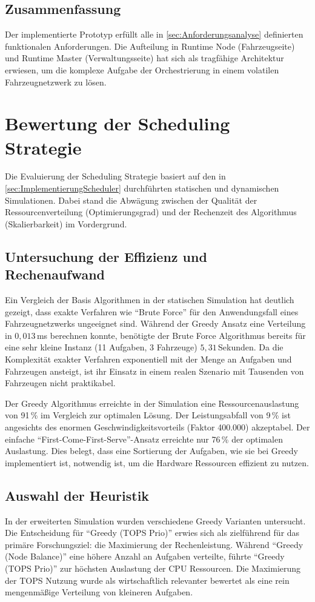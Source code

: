 \subsection{Zusammenfassung}
Der implementierte Prototyp erfüllt alle in \autoref{sec:Anforderungsanalyse} definierten funktionalen Anforderungen. Die Aufteilung in Runtime Node (Fahrzeugseite) und Runtime Master (Verwaltungsseite) hat sich als tragfähige Architektur erwiesen, um die komplexe Aufgabe der Orchestrierung in einem volatilen Fahrzeugnetzwerk zu lösen.

\section{Bewertung der Scheduling Strategie}
\label{sec:BewertungScheduling}

Die Evaluierung der Scheduling Strategie basiert auf den in \autoref{sec:ImplementierungScheduler} durchführten statischen und dynamischen Simulationen. Dabei stand die Abwägung zwischen der Qualität der Ressourcenverteilung (Optimierungsgrad) und der Rechenzeit des Algorithmus (Skalierbarkeit) im Vordergrund.

\subsection{Untersuchung der Effizienz und Rechenaufwand}
Ein Vergleich der Basis Algorithmen in der statischen Simulation hat deutlich gezeigt, dass exakte Verfahren wie \enquote{Brute Force} für den Anwendungsfall eines Fahrzeugnetzwerks ungeeignet sind. Während der Greedy Ansatz eine Verteilung in $0,013$\,ms berechnen konnte, benötigte der Brute Force Algorithmus bereits für eine sehr kleine Instanz (11 Aufgaben, 3 Fahrzeuge) $5,31$\,Sekunden. Da die Komplexität exakter Verfahren exponentiell mit der Menge an Aufgaben und Fahrzeugen ansteigt, ist ihr Einsatz in einem realen Szenario mit Tausenden von Fahrzeugen nicht praktikabel. 

Der Greedy Algorithmus erreichte in der Simulation eine Ressourcenauslastung von 91\,\% im Vergleich zur optimalen Lösung. Der Leistungsabfall von 9\,\% ist angesichts des enormen Geschwindigkeitsvorteils (Faktor 400.000) akzeptabel. Der einfache \enquote{First-Come-First-Serve}-Ansatz erreichte nur 76\,\% der optimalen Auslastung. Dies belegt, dass eine Sortierung der Aufgaben, wie sie bei Greedy implementiert ist, notwendig ist, um die Hardware Ressourcen effizient zu nutzen.

\subsection{Auswahl der Heuristik}
In der erweiterten Simulation wurden verschiedene Greedy Varianten untersucht. Die Entscheidung für \enquote{Greedy (TOPS Prio)} erwies sich als zielführend für das primäre Forschungsziel: die Maximierung der Rechenleistung. Während \enquote{Greedy (Node Balance)} eine höhere Anzahl an Aufgaben verteilte, führte \enquote{Greedy (TOPS Prio)} zur höchsten Auslastung der CPU Ressourcen. Die Maximierung der TOPS Nutzung wurde als wirtschaftlich relevanter bewertet als eine rein mengenmäßige Verteilung von kleineren Aufgaben.

